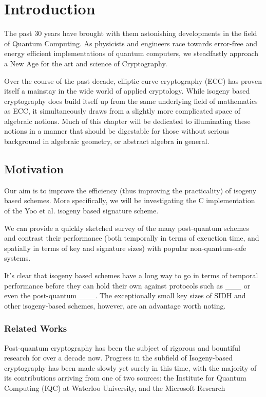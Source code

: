 \chapter{Introduction}

The past 30 years have brought with them astonishing developments in the field of Quantum Computing. As physicists and engineers race towards error-free and energy efficient implementations of quantum computers, we steadfastly approach a New Age for the art and science of Cryptography. 

Over the course of the past decade, elliptic curve cryptography (ECC) has proven itself a mainstay in the wide world of applied cryptology. While isogeny based cryptography does build itself up from the same underlying field of mathematics as ECC, it simultaneously draws from a slightly more complicated space of algebraic notions. Much of this chapter will be dedicated to illuminating these notions in a manner that should be digestable for those without serious background in algebraic geometry, or abstract algebra in general.


\section{Motivation}

Our aim is to improve the efficiency (thus improving the practicality) of isogeny based schemes. More specifically, we will be investigating the C implementation of the Yoo et al. isogeny based signature scheme. 

We can provide a quickly sketched survey of the many post-quantum schemes and contrast their performance (both temporally in terms of exeuction time, and spatially in terms of key and signature sizes) with popular non-quantum-safe systems.

It's clear that isogeny based schemes have a long way to go in terms of temporal performance before they can hold their own against protocols such as \_\_\_ or even the post-quantum \_\_\_. The exceptionally small key sizes of SIDH and other isogeny-based schemes, however, are an advantage worth noting. 

\subsection{Related Works}

Post-quantum cryptography has been the subject of rigorous and bountiful research for over a decade now. Progress in the subfield of Isogeny-based cryptography has been made slowly yet surely in this time, with the majority of its contributions arriving from one of two sources: the Institute for Quantum Computing (IQC) at Waterloo University, and the Microsoft Research  

